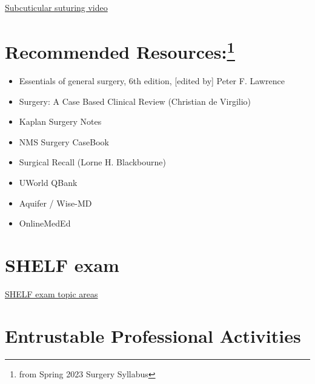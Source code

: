 \documentclass[
  letterpaper,
]{scrbook}
\providecommand{\tightlist}{%
  \setlength{\itemsep}{0pt}\setlength{\parskip}{0pt}}
\begin{document}
\href{https://www.youtube.com/watch?v=M3vISruyFkI}{Subcuticular suturing
video}

\section[Recommended Resources:]{\texorpdfstring{Recommended
Resources:\footnote{from Spring 2023 Surgery Syllabus}}{Recommended Resources:}}\label{recommended-resources01-students-2}

\begin{itemize}
\tightlist
\item
  Essentials of general surgery, 6th edition, {[}edited by{]} Peter F.
  Lawrence
\item
  Surgery: A Case Based Clinical Review (Christian de Virgilio)
\item
  Kaplan Surgery Notes
\item
  NMS Surgery CaseBook
\item
  Surgical Recall (Lorne H. Blackbourne)
\item
  UWorld QBank
\item
  Aquifer / Wise-MD
\item
  OnlineMedEd
\end{itemize}

\section{SHELF exam}\label{shelf-exam}

\href{https://www.nbme.org/subject-exams/clinical-science/surgery}{SHELF
exam topic areas}

\section{Entrustable Professional
Activities}\label{entrustable-professional-activities}
\end{document}
